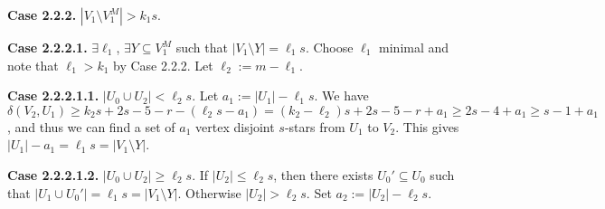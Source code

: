 \documentclass[oneside,12pt]{memoir}
\begin{document}
% 



\textbf{Case 2.2.2.} $|V_1\setminus V_1^M|>k_1s$.

\textbf{Case 2.2.2.1.} $\exists \ell_1$, $\exists Y\subseteq V_1^M$ such that $|V_1\setminus Y|=\ell_1s$.  Choose $\ell_1$ minimal and note that $\ell_1>k_1$ by Case 2.2.2.  Let $\ell_2:=m-\ell_1$.


\textbf{Case 2.2.2.1.1.} $|U_0\cup U_2|< \ell_2s$.  Let $a_1:=|U_1|-\ell_1s$. We have $\delta(V_2, U_1)\geq k_2s+2s-5-r-(\ell_2s-a_1)=(k_2-\ell_2)s+2s-5-r+a_1\geq 2s-4+a_1\geq s-1+a_1$, and thus we can find a set of $a_1$ vertex disjoint $s$-stars from $U_1$ to $V_2$.  This gives $|U_1|-a_1=\ell_1s=|V_1\setminus Y|$.  

\textbf{Case 2.2.2.1.2.} $|U_0\cup U_2|\geq \ell_2s$.  If $|U_2|\leq \ell_2s$, then there exists $U_0'\subseteq U_0$ such that $|U_1\cup U_0'|=\ell_1s=|V_1\setminus Y|$.  Otherwise $|U_2|>\ell_2s$.  Set $a_2:=|U_2|-\ell_2s$.  
\end{document}
